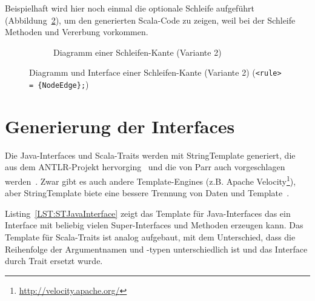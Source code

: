 \documentclass[../InterneDSLs.tex]{subfiles}
\begin{document}
Beispielhaft wird hier noch einmal die optionale Schleife aufgeführt (Abbildung~\ref{FIG:ScalaLoopNodeAlt}), um den generierten Scala-Code zu zeigen, weil bei der Schleife Methoden und Vererbung vorkommen.
\begin{figure}[ht]
\centering
  \begin{subfigure}[c]{0.49\textwidth}
    \caption{Diagramm einer Schleifen-Kante (Variante 2)}
    \label{FIG:ScalaDiagramLoopNodeAlt}
  \end{subfigure}
  \begin{subfigure}[c]{0.49\textwidth}
    
  \end{subfigure}
  \caption{Diagramm und Interface einer Schleifen-Kante (Variante 2) (\texttt{<rule> = \{NodeEdge\};})}
  \label{FIG:ScalaLoopNodeAlt}
\end{figure}


\section{Generierung der Interfaces}
Die Java-Interfaces und Scala-Traits werden mit StringTemplate generiert, die aus dem ANTLR-Projekt hervorging~\cite{stringtemplate.github} und die von Parr auch vorgeschlagen werden~\cite[S. 313 ff]{Parr.2010}. Zwar gibt es auch andere Template-Engines (z.B. Apache Velocity\footnote{\url{http://velocity.apache.org/}}), aber StringTemplate biete eine bessere Trennung von Daten und Template~\cite{parr2004enforcing}.

Listing~\ref{LST:STJavaInterface} zeigt das Template für Java-Interfaces das ein Interface mit beliebig vielen Super-Interfaces und Methoden erzeugen kann. Das Template für Scala-Traits ist analog aufgebaut, mit dem Unterschied, dass die Reihenfolge der Argumentnamen und -typen unterschiedlich ist und das Interface durch Trait ersetzt wurde.
\end{document}
